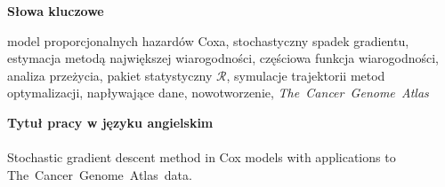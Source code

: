 \documentclass[]{mini}
\begin{document}
\begin{center}
\textbf{Słowa kluczowe} 
\end{center}
model proporcjonalnych hazardów Coxa, stochastyczny spadek gradientu, estymacja metodą największej wiarogodności, częściowa funkcja wiarogodności, analiza przeżycia, pakiet statystyczny $\mathcal{R}$, symulacje trajektorii metod optymalizacji, napływające dane, nowotworzenie, \textit{The~Cancer~Genome~Atlas} \ \\

\begin{center}
\textbf{Tytuł pracy w języku angielskim} \\ \ \\ \vspace{-10pt}
Stochastic gradient descent method in Cox models with applications to \\ The~Cancer~Genome~Atlas~data.
\end{center}



\tableofcontents













\appendix

%






\makestatement
\end{document}
